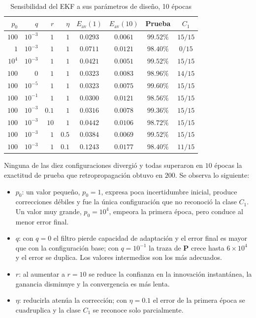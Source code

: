 \documentclass[conference]{IEEEtran}
\begin{document}
\begin{table}[htbp]
\caption{Sensibilidad del EKF a sus parámetros de diseño, 10 épocas}
\label{tab:sens}
\begin{center}
\setlength{\tabcolsep}{3.5pt}
\begin{tabular}{rrrrcccc}
\toprule
$p_0$ & $q$ & $r$ & $\eta$ & $E_{\text{av}}(1)$ & $E_{\text{av}}(10)$ & \textbf{Prueba} & $C_1$ \\
\midrule
$100$    & $10^{-3}$ & $1$   & $1$   & $0.0293$ & $0.0061$ & $99.52\%$ & $15/15$ \\
\midrule
$1$      & $10^{-3}$ & $1$   & $1$   & $0.0711$ & $0.0121$ & $98.40\%$ & $0/15$ \\
$10^{4}$ & $10^{-3}$ & $1$   & $1$   & $0.0421$ & $0.0051$ & $99.52\%$ & $15/15$ \\
\midrule
$100$    & $0$       & $1$   & $1$   & $0.0323$ & $0.0083$ & $98.96\%$ & $14/15$ \\
$100$    & $10^{-5}$ & $1$   & $1$   & $0.0323$ & $0.0075$ & $99.60\%$ & $15/15$ \\
$100$    & $10^{-1}$ & $1$   & $1$   & $0.0300$ & $0.0121$ & $98.56\%$ & $15/15$ \\
\midrule
$100$    & $10^{-3}$ & $0.1$ & $1$   & $0.0316$ & $0.0078$ & $99.36\%$ & $15/15$ \\
$100$    & $10^{-3}$ & $10$  & $1$   & $0.0442$ & $0.0106$ & $98.72\%$ & $15/15$ \\
\midrule
$100$    & $10^{-3}$ & $1$   & $0.5$ & $0.0384$ & $0.0069$ & $99.52\%$ & $15/15$ \\
$100$    & $10^{-3}$ & $1$   & $0.1$ & $0.1243$ & $0.0177$ & $98.40\%$ & $11/15$ \\
\bottomrule
\end{tabular}
\end{center}
\end{table}

Ninguna de las diez configuraciones divergió y todas superaron en $10$
épocas la exactitud de prueba que retropropagación obtuvo en $200$. Se
observa lo siguiente:
\begin{itemize}
    \item $p_0$: un valor pequeño, $p_0=1$, expresa poca incertidumbre
    inicial, produce correcciones débiles y fue la única configuración que
    no reconoció la clase $C_1$. Un valor muy grande, $p_0=10^4$, empeora la
    primera época, pero conduce al menor error final.
    \item $q$: con $q=0$ el filtro pierde capacidad de adaptación y el error
    final es mayor que con la configuración base; con $q=10^{-1}$ la traza de
    $\mathbf{P}$ crece hasta $6\times10^4$ y el error se duplica. Los valores
    intermedios son los más adecuados.
    \item $r$: al aumentar a $r=10$ se reduce la confianza en la innovación
    instantánea, la ganancia disminuye y la convergencia es más lenta.
    \item $\eta$: reducirla atenúa la corrección; con $\eta=0.1$ el error de
    la primera época se cuadruplica y la clase $C_1$ se reconoce solo
    parcialmente.
\end{itemize}
\end{document}
